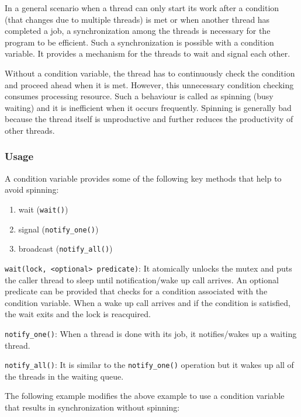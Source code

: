 \documentclass{scrartcl}
\begin{document}
In a general scenario when a thread can only start its work after a condition (that changes due to multiple threads) is met or when another thread has completed a job, a synchronization among the threads is necessary for the program to be efficient. Such a synchronization is possible with a condition variable. It provides a mechanism for the threads to wait and signal each other.

Without a condition variable, the thread has to continuously check the condition and proceed ahead when it is met. However, this unnecessary condition checking consumes processing resource. Such a behaviour is called as spinning (busy waiting) and it is inefficient when it occurs frequently. Spinning is generally bad because the thread itself is unproductive and further reduces the productivity of other threads.

\subsubsection{Usage}
A condition variable provides some of the following key methods that help to avoid spinning:

\begin{enumerate}
    \item wait (\texttt{wait()})
    \item signal (\texttt{notify_one()})
    \item broadcast (\texttt{notify_all()})
\end{enumerate}

\texttt{wait(lock, <optional> predicate)}: It atomically unlocks the mutex and puts the caller thread to sleep until notification/wake up call arrives. An optional predicate can be provided that checks for a condition associated with the condition variable. When a wake up call arrives and if the condition is satisfied, the wait exits and the lock is reacquired.

\texttt{notify_one()}: When a thread is done with its job, it notifies/wakes up a waiting thread.

\texttt{notify_all()}: It is similar to the \texttt{notify_one()} operation but it wakes up all of the threads in the waiting queue. 

The following example modifies the above example to use a condition variable that results in synchronization without spinning:
\end{document}
